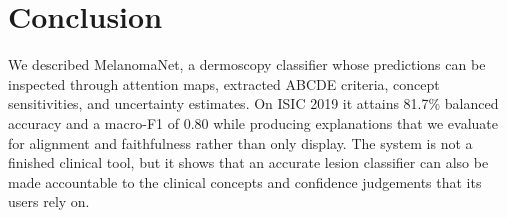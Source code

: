 \section{Conclusion}

We described MelanomaNet, a dermoscopy classifier whose predictions can be
inspected through attention maps, extracted ABCDE criteria, concept
sensitivities, and uncertainty estimates. On ISIC 2019 it attains 81.7\%
balanced accuracy and a macro-F1 of 0.80 while producing explanations that we
evaluate for alignment and faithfulness rather than only display. The system is
not a finished clinical tool, but it shows that an accurate lesion classifier
can also be made accountable to the clinical concepts and confidence judgements
that its users rely on.
